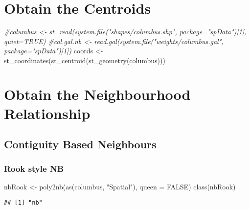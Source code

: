 \documentclass[
]{book}
\newenvironment{Shaded}{\begin{snugshade}}{\end{snugshade}}
\newcommand{\AttributeTok}[1]{\textcolor[rgb]{0.77,0.63,0.00}{#1}}
\newcommand{\CommentTok}[1]{\textcolor[rgb]{0.56,0.35,0.01}{\textit{#1}}}
\newcommand{\ConstantTok}[1]{\textcolor[rgb]{0.00,0.00,0.00}{#1}}
\newcommand{\FunctionTok}[1]{\textcolor[rgb]{0.00,0.00,0.00}{#1}}
\newcommand{\NormalTok}[1]{#1}
\newcommand{\OtherTok}[1]{\textcolor[rgb]{0.56,0.35,0.01}{#1}}
\newcommand{\StringTok}[1]{\textcolor[rgb]{0.31,0.60,0.02}{#1}}
\begin{document}
\hypertarget{obtain-the-centroids}{%
\section{Obtain the Centroids}\label{obtain-the-centroids}}

\begin{Shaded}
\begin{Highlighting}[]
\CommentTok{\#columbus \textless{}{-} st\_read(system.file("shapes/columbus.shp", package="spData")[1], quiet=TRUE)}
\CommentTok{\#col.gal.nb \textless{}{-} read.gal(system.file("weights/columbus.gal", package="spData")[1])}
\NormalTok{coords }\OtherTok{\textless{}{-}} \FunctionTok{st\_coordinates}\NormalTok{(}\FunctionTok{st\_centroid}\NormalTok{(}\FunctionTok{st\_geometry}\NormalTok{(columbus)))}
\end{Highlighting}
\end{Shaded}

\hypertarget{obtain-the-neighbourhood-relationship}{%
\section{Obtain the Neighbourhood Relationship}\label{obtain-the-neighbourhood-relationship}}

\hypertarget{contiguity-based-neighbours}{%
\subsection{Contiguity Based Neighbours}\label{contiguity-based-neighbours}}

\hypertarget{rook-style-nb}{%
\subsubsection{Rook style NB}\label{rook-style-nb}}

\begin{Shaded}
\begin{Highlighting}[]
\NormalTok{nbRook }\OtherTok{\textless{}{-}} \FunctionTok{poly2nb}\NormalTok{(}\FunctionTok{as}\NormalTok{(columbus, }\StringTok{"Spatial"}\NormalTok{), }\AttributeTok{queen =} \ConstantTok{FALSE}\NormalTok{)}
\FunctionTok{class}\NormalTok{(nbRook)}
\end{Highlighting}
\end{Shaded}

\begin{verbatim}
## [1] "nb"
\end{verbatim}
\end{document}
